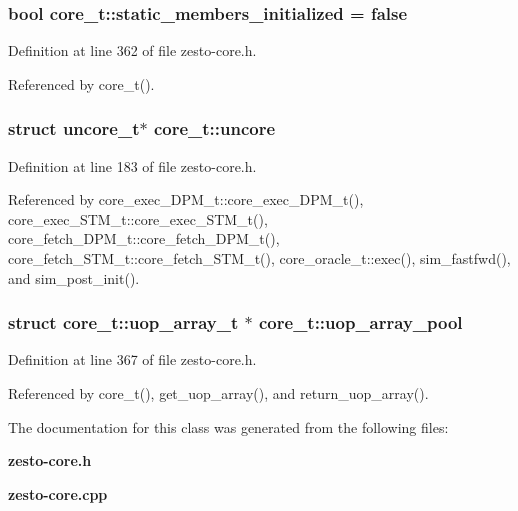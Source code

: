 \subsubsection[{static\_\-members\_\-initialized}]{\setlength{\rightskip}{0pt plus 5cm}bool {\bf core\_\-t::static\_\-members\_\-initialized} = false\hspace{0.3cm}{\tt  [static, protected]}}\label{classcore__t_a19321fb18dd553ca143e2b1bf1fa74a}




Definition at line 362 of file zesto-core.h.

Referenced by core\_\-t().
\subsubsection[{uncore}]{\setlength{\rightskip}{0pt plus 5cm}struct {\bf uncore\_\-t}$\ast$ {\bf core\_\-t::uncore}\hspace{0.3cm}{\tt  [read]}}\label{classcore__t_68240450aa17761096c76bb4732a4e64}




Definition at line 183 of file zesto-core.h.

Referenced by core\_\-exec\_\-DPM\_\-t::core\_\-exec\_\-DPM\_\-t(), core\_\-exec\_\-STM\_\-t::core\_\-exec\_\-STM\_\-t(), core\_\-fetch\_\-DPM\_\-t::core\_\-fetch\_\-DPM\_\-t(), core\_\-fetch\_\-STM\_\-t::core\_\-fetch\_\-STM\_\-t(), core\_\-oracle\_\-t::exec(), sim\_\-fastfwd(), and sim\_\-post\_\-init().
\subsubsection[{uop\_\-array\_\-pool}]{\setlength{\rightskip}{0pt plus 5cm}struct {\bf core\_\-t::uop\_\-array\_\-t} $\ast$ {\bf core\_\-t::uop\_\-array\_\-pool}\hspace{0.3cm}{\tt  [static, read, protected]}}\label{classcore__t_be353d72e840f6c7c2b2ed074d4c4f85}




Definition at line 367 of file zesto-core.h.

Referenced by core\_\-t(), get\_\-uop\_\-array(), and return\_\-uop\_\-array().

The documentation for this class was generated from the following files:\begin{CompactItemize}
\item 
{\bf zesto-core.h}\item 
{\bf zesto-core.cpp}\end{CompactItemize}
